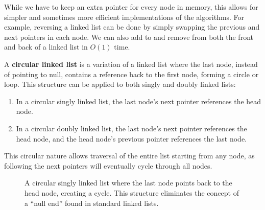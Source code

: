   While we have to keep an extra pointer for every node in memory, this allows for simpler and sometimes more efficient implementations of the algorithms. For example, reversing a linked list can be done by simply swapping the previous and next pointers in each node. We can also add to and remove from both the front and back of a linked list in $O(1)$ time. 

  \begin{definition}
    A \textbf{circular linked list} is a variation of a linked list where the last node, instead of pointing to null, contains a reference back to the first node, forming a circle or loop. This structure can be applied to both singly and doubly linked lists:
    \begin{enumerate}
      \item In a circular singly linked list, the last node's next pointer references the head node.
      \item In a circular doubly linked list, the last node's next pointer references the head node, and the head node's previous pointer references the last node.
    \end{enumerate}
    This circular nature allows traversal of the entire list starting from any node, as following the next pointers will eventually cycle through all nodes.
    \begin{figure}[H]
      \centering 
      \caption{A circular singly linked list where the last node points back to the head node, creating a cycle. This structure eliminates the concept of a ``null end'' found in standard linked lists.}
      \label{fig:circular_linked_list}
    \end{figure}
  \end{definition}


